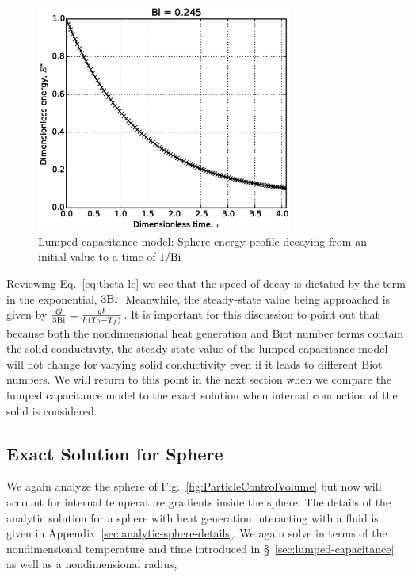 \begin{figure}[ht]
	\centering
		\includegraphics[width=0.75\textwidth]{chapters/figures/LC-sphere-in-fluid}
	\caption[Lumped Capacitance energy profile]{Lumped capacitance model: Sphere energy profile decaying from an initial value to a time of $1/\mathrm{Bi}$}
	\label{fig:LC-sphere-in-fluid}
\end{figure}

Reviewing Eq.~\ref{eq:theta-lc} we see that the speed of decay is dictated by the term in the exponential, $3\mathrm{Bi}$. Meanwhile, the steady-state value being approached is given by $\frac{G}{3\mathrm{Bi}} = \frac{gb}{h(T_0 - T_f)}$. It is important for this discussion to point out that because both the nondimensional heat generation and Biot number terms contain the solid conductivity, the steady-state value of the lumped capacitance model will not change for varying solid conductivity even if it leads to different Biot numbers. We will return to this point in the next section when we compare the lumped capacitance model to the exact solution when internal conduction of the solid is considered.



\subsection{Exact Solution for Sphere}\label{sec:analytic-sphere}

We again analyze the sphere of Fig.~\ref{fig:ParticleControlVolume} but now will account for internal temperature gradients inside the sphere. The details of the analytic solution for a sphere with heat generation interacting with a fluid is given in Appendix~\ref{sec:analytic-sphere-details}. We again solve in terms of the nondimensional temperature and time introduced in \S~\ref{sec:lumped-capacitance} as well as a nondimensional radius,

